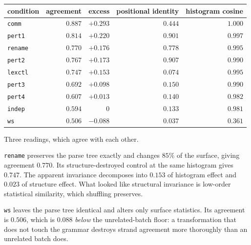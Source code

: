 \begin{center}
\begin{tabular}{lrrrr}
\hline
condition & agreement & excess & positional identity & histogram cosine \\
\hline
\texttt{comm}   & $0.887$ & $+0.293$ & $0.444$ & $1.000$ \\
\texttt{pert1}  & $0.814$ & $+0.220$ & $0.901$ & $0.997$ \\
\texttt{rename} & $0.770$ & $+0.176$ & $0.778$ & $0.995$ \\
\texttt{pert2}  & $0.767$ & $+0.173$ & $0.907$ & $0.990$ \\
\texttt{lexctl} & $0.747$ & $+0.153$ & $0.074$ & $0.995$ \\
\texttt{pert3}  & $0.692$ & $+0.098$ & $0.150$ & $0.990$ \\
\texttt{pert4}  & $0.607$ & $+0.013$ & $0.140$ & $0.982$ \\
\texttt{indep}  & $0.594$ & $0$      & $0.133$ & $0.981$ \\
\texttt{ws}     & $0.506$ & $-0.088$ & $0.037$ & $0.361$ \\
\hline
\end{tabular}
\end{center}

Three readings, which agree with each other.

\begin{observation}
\label{obs:lexctl}
\texttt{rename} preserves the parse tree exactly and changes $85\%$ of the
surface, giving agreement $0.770$. Its structure-destroyed control at the same
histogram gives $0.747$. The apparent invariance decomposes into $0.153$ of
histogram effect and $0.023$ of structure effect. What looked like structural
invariance is low-order statistical similarity, which shuffling preserves.
\end{observation}

\begin{observation}
\label{obs:ws}
\texttt{ws} leaves the parse tree identical and alters only surface statistics.
Its agreement is $0.506$, which is $0.088$ \emph{below} the unrelated-batch
floor: a transformation that does not touch the grammar destroys strand
agreement more thoroughly than an unrelated batch does.
\end{observation}

